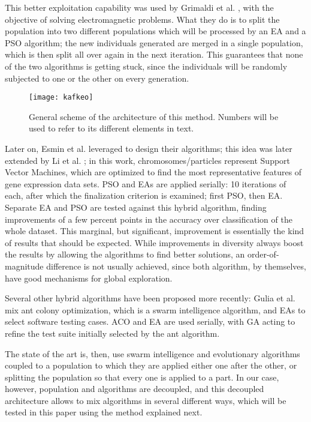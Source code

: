 This better exploitation capability was used by Grimaldi et al.
\cite{grimaldi2005genetical}, with the objective of solving electromagnetic problems. What they do is
to split the population into two different populations which will be
processed by an EA and a PSO algorithm; the new individuals generated
are merged in a single population, which is then split all over again
in the next iteration. This guarantees that none of the two algorithms
is getting stuck, since the individuals will be randomly subjected to
one or the other on every generation.


\begin{figure*}
\texttt{[image: kafkeo]}
\caption{General scheme of the architecture of this method. Numbers will be used to refer to its different elements in text.}
\label{fig:kafkeo}
\end{figure*}
%
Later on, Esmin et al. \cite{esmin2006hybrid} leveraged to design their
algorithms; this idea was
later extended by Li et al. \cite{li2008gene}; in this work,
chromosomes/particles represent Support Vector Machines, which are
optimized to find the most representative features of gene expression
data sets. PSO and EAs are applied serially: 10 iterations of each,
after which the finalization criterion is examined; first PSO, then
EA. Separate EA and PSO are tested against this hybrid algorithm,
finding improvements of a few percent points in the accuracy over
classification of the whole dataset. This marginal, but significant,
improvement is essentially the kind of results that should be
expected. While improvements in diversity always boost the results by
allowing the algorithms to find better solutions, an
order-of-magnitude difference is not usually  achieved, since both
algorithm, by themselves, have good mechanisms for global
exploration.

Several other hybrid algorithms have been proposed more recently:
Gulia et al. \cite{gulia2019hybrid} mix ant colony optimization, 
which is a swarm intelligence algorithm, and EAs to select
software testing cases. ACO and EA are used serially, with GA acting
to refine the test suite initially selected by the ant algorithm.

The state of the art is, then, use swarm intelligence and evolutionary
algorithms coupled to a population to which they are applied either
one after the other, or splitting the population so that every one is
applied to a part. In our case, however, population and algorithms are
decoupled, and this decoupled architecture allows to mix algorithms in
several different ways, which will be tested in this paper using the
method explained next.


